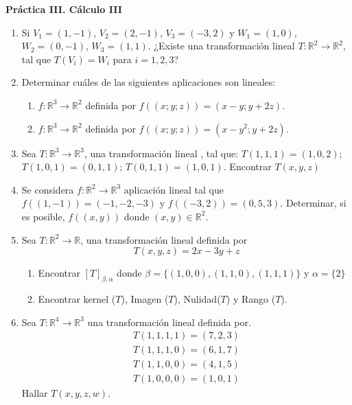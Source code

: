 \documentclass[12pt,letterpaper]{article}
\begin{document}
\begin{center}
    {\Large \bf Práctica III. Cálculo III}
\end{center}

\begin{enumerate}
  \item Si $V_1 = (1,-1)$, $V_2 = (2,-1)$, $V_3=(-3,2)$ y $W_1=(1,0)$, $W_2=(0,-1)$, $W_3=(1,1)$. ¿Existe una transformación lineal $T: \mathbb{R}^2\to\mathbb{R}^2$, tal que $T(V_i) = W_i$ para $i=1,2,3$?
  \item Determinar cuáles de las siguientes aplicaciones son lineales:
  \begin{enumerate}
    \item $f : \mathbb{R}^3\to\mathbb{R}^2$ definida por $f((x; y; z)) = (x - y; y + 2z)$.
    \item $f : \mathbb{R}^3\to\mathbb{R}^2$ definida por $f((x; y; z)) = (x - y^2; y + 2z)$.
  \end{enumerate}
  \item Sea $T: \mathbb{R}^3\to\mathbb{R}^3$, una transformación lineal , tal que: $T (1,1,1) = (1,0,2)$; $T( 1,0,1) = (0,1,1)$; $T ( 0,1,1) = ( 1,0,1)$. Encontrar $T(x,y,z)$
  \item Se considera $f : \mathbb{R}^2\to\mathbb{R}^3$ aplicación lineal tal que $f((1,-1)) = (-1,-2,-3)$ y $f((-3, 2)) = (0, 5, 3)$. Determinar, si es posible, $f((x, y))$ donde $(x, y) \in \mathbb{R}^2$.
  \item Sea $T: \mathbb{R}^2\to\mathbb{R}$, una transformación lineal definida por
  $$
  T (x,y,z) = 2x -3y +z
  $$
  \begin{enumerate}
    \item Encontrar $[T]_{\beta,\alpha}$ donde $\beta = \{(1,0,0),(1,1,0),(1,1,1)\}$ y $\alpha =\{2\}$
    \item  Encontrar kernel ($T$), Imagen ($T$), Nulidad($T$) y Rango ($T$).
  \end{enumerate}
  \item Sea $T: \mathbb{R}^4\to\mathbb{R}^3$ una transformación lineal definida por.
  \begin{align*}
    T(1,1,1,1) = (7,2,3)\\
    T(1,1,1,0) =(6,1,7)\\
    T(1,1,0,0) = (4,1,5)\\
    T(1,0,0,0) = (1,0,1)
  \end{align*}
  Hallar $T( x,y,z,w)$.
\end{enumerate}
\end{document}

